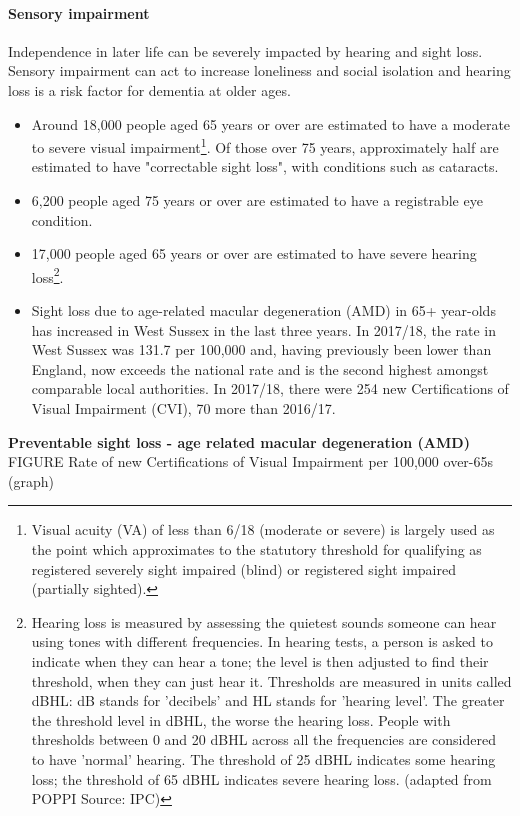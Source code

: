 \paragraph{Sensory impairment} Independence in later life can be severely impacted by hearing and sight loss. Sensory impairment can act to increase loneliness and social isolation and hearing loss is a risk factor for dementia at older ages.

\begin{itemize}
    \item Around 18,000 people aged 65 years or over are estimated to have a moderate to severe visual impairment\footnote{Visual acuity (VA) of less than 6/18 (moderate or severe) is largely used as the point which approximates to the statutory threshold for qualifying as registered severely sight impaired (blind) or registered sight impaired (partially sighted).}. Of those over 75 years, approximately half are estimated to have "correctable sight loss", with conditions such as cataracts.
    \item 6,200 people aged 75 years or over are estimated to have a registrable eye condition.
    \item 17,000 people aged 65 years or over are estimated to have severe hearing loss\footnote{Hearing loss is measured by assessing the quietest sounds someone can hear using tones with different frequencies. In hearing tests, a person is asked to indicate when they can hear a tone; the level is then adjusted to find their threshold, when they can just hear it. Thresholds are measured in units called dBHL: dB stands for 'decibels' and HL stands for 'hearing level'. The greater the threshold level in dBHL, the worse the hearing loss. People with thresholds between 0 and 20 dBHL across all the frequencies are considered to have 'normal' hearing. The threshold of 25 dBHL indicates some hearing loss; the threshold of 65 dBHL indicates severe hearing loss. (adapted from POPPI Source: IPC)}.
    \item Sight loss due to age-related macular degeneration (AMD) in 65+ year-olds has increased in West Sussex in the last three years. In 2017/18, the rate in West Sussex was 131.7 per 100,000 and, having previously been lower than England, now exceeds the national rate and is the second highest amongst comparable local authorities. In 2017/18, there were 254 new Certifications of Visual Impairment (CVI), 70 more than 2016/17.
\end{itemize}

{\bf Preventable sight loss - age related macular degeneration (AMD)}
FIGURE Rate of new Certifications of Visual Impairment per 100,000 over-65s (graph)

